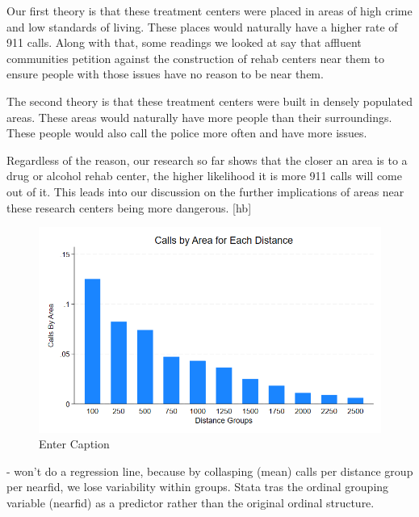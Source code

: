 \documentclass[12pt]{article}
\begin{document}
Our first theory is that these treatment centers were placed in areas of high crime and low standards of living. These places would naturally have a higher rate of 911 calls. Along with that, some readings we looked at say that affluent communities petition against the construction of rehab centers near them to ensure people with those issues have no reason to be near them.

The second theory is that these treatment centers were built in densely populated areas. These areas would naturally have more people than their surroundings. These people would also call the police more often and have more issues.

Regardless of the reason, our research so far shows that the closer an area is to a drug or alcohol rehab center, the higher likelihood it is more 911 calls will come out of it. This leads into our discussion on the further implications of areas near these research centers being more dangerous.
\label{sec:result}[hb]
\begin{figure}
    \centering
    \includegraphics[width=1\linewidth]{Reproducibility Package//Visual Graphics/Avg_Calls_per_Distance_Group.png}
    \caption{Enter Caption}
    \label{fig: Average Number of Calls per Distance Group}
\end{figure}

- won't do a regression line, because by collasping (mean) calls per distance group per nearfid, we lose variability within groups. Stata tras the ordinal grouping variable (nearfid) as a predictor rather than the original ordinal structure. 
\end{document}

